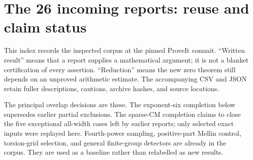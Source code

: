 \section{The 26 incoming reports: reuse and claim status}

This index records the inspected corpus at the pinned ProveIt commit. ``Written result'' means that a report supplies a mathematical argument; it is not a blanket certification of every assertion. ``Reduction'' means the new zero theorem still depends on an unproved arithmetic estimate. The accompanying CSV and JSON retain fuller descriptions, cautions, archive hashes, and source locations.

The principal overlap decisions are these. The exponent-six completion below supersedes earlier partial exclusions. The sparse-CM completion claims to close the five exceptional all-width cases left by earlier reports; only selected exact inputs were replayed here. Fourth-power sampling, positive-part Mellin control, torsion-grid selection, and general finite-group detectors are already in the corpus. They are used as a baseline rather than relabelled as new results.


